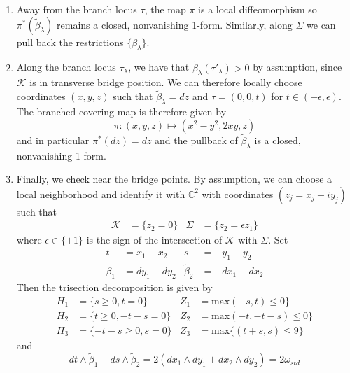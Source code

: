 \documentclass[11pt]{amsart}
\theoremstyle{definition}
\theoremstyle{remark}
\numberwithin{equation}{section}
\newcommand{\betat}{\widetilde{\beta}}
\newcommand{\cK}{\mathcal{K}}
\newcommand{\CC}{\mathbb{C}}
\begin{document}
\begin{enumerate}
\item Away from the branch locus $\tau$, the map $\pi$ is a local diffeomorphism so $\pi^*(\betat_{\lambda})$ remains a closed, nonvanishing 1-form.  Similarly, along $\Sigma$ we can pull back the restrictions $\{\beta_{\lambda}\}$.
\item Along the branch locus $\tau_{\lambda}$, we have that $\betat_{\lambda}(\tau'_{\lambda}) > 0$ by assumption, since $\cK$ is in transverse bridge position.  We can therefore locally choose coordinates $(x,y,z)$ such that $\betat_{\lambda} = dz$ and $\tau = (0,0,t)$ for $t \in (-\epsilon,\epsilon)$.  The branched covering map is therefore given by 
\[\pi: (x,y,z) \mapsto (x^2 - y^2, 2xy, z)\]
and in particular $\pi^*(dz) = dz$ and the pullback of $\betat_{\lambda}$ is a closed, nonvanishing 1-form.
\item Finally, we check near the bridge points.  By assumption, we can choose a local neighborhood and identify it with $\CC^2$ with coordinates $(z_j = x_j + i y_j)$ such that
\begin{align*}
    \cK &= \{ z_2 = 0\} & \Sigma &= \{z_2 = \epsilon  \overline{z_1}\}
\end{align*}
where $\epsilon \in \{\pm 1\}$ is the sign of the intersection of $\cK$ with $\Sigma$.  Set 
\begin{align*}
    t &= x_1 - x_2 & s &= -y_1 - y_2 \\
    \betat_1 &= dy_1 - dy_2 & \betat_2 &= -dx_1 - dx_2
\end{align*}
Then the trisection decomposition is given by
\begin{align*}
H_1 &= \{s \geq 0, t = 0\} & Z_1 & =\text{max}(-s,t) \leq 0 \} \\
H_2 &= \{t \geq 0, -t -s = 0\} & Z_2 &=\text{max}(-t,-t-s) \leq 0\} \\
H_3 &= \{-t - s \geq 0, s = 0\} & Z_3 &= \text{max}\{(t+s,s) \leq 9\}
\end{align*}
and
\[dt \wedge \betat_1 - ds \wedge \betat_2 = 2 \left( dx_1 \wedge dy_1 + dx_2 \wedge dy_2 \right) = 2 \omega_{std}\]


\end{enumerate}
\end{document}
